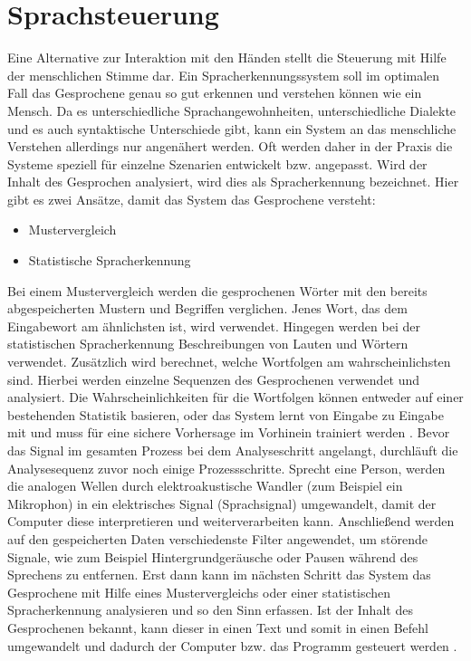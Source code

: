 \section{Sprachsteuerung}
Eine Alternative zur Interaktion mit den Händen stellt die Steuerung mit Hilfe der menschlichen Stimme dar. Ein Spracherkennungssystem soll im optimalen Fall das \mbox{Gesprochene} genau so gut erkennen und verstehen können wie ein Mensch. Da es unterschiedliche Sprachangewohnheiten, unterschiedliche Dialekte und es auch \mbox{syntaktische} Unterschiede gibt, kann ein System an das menschliche Verstehen \mbox{allerdings} nur angenähert werden. Oft werden daher in der Praxis die Systeme speziell für einzelne Szenarien entwickelt bzw. angepasst. 
\newline \newline
Wird der Inhalt des Gesprochen analysiert, wird dies als Spracherkennung bezeichnet. Hier gibt es zwei Ansätze, damit das System das Gesprochene versteht:
\begin{itemize}
      \item Mustervergleich
      \item Statistische Spracherkennung
\end{itemize}
\vspace{\baselineskip}
Bei einem Mustervergleich werden die gesprochenen Wörter mit den bereits abgespeicherten Mustern und Begriffen verglichen. Jenes Wort, das dem Eingabewort am ähnlichsten ist, wird verwendet. Hingegen werden bei der statistischen Spracherkennung Beschreibungen von Lauten und Wörtern verwendet. Zusätzlich wird berechnet, welche Wortfolgen am wahrscheinlichsten sind. Hierbei werden einzelne Sequenzen des Gesprochenen verwendet und analysiert. Die Wahrscheinlichkeiten für die Wortfolgen können entweder auf einer bestehenden Statistik basieren, oder das System lernt von Eingabe zu Eingabe mit und muss für eine sichere Vorhersage im Vorhinein trainiert werden \cite{KaufmannPfisterSprache}. 
\newline \newline
Bevor das Signal im gesamten Prozess bei dem Analyseschritt angelangt, durchläuft die Analysesequenz zuvor noch einige Prozessschritte. Sprecht eine Person, werden die analogen Wellen durch elektroakustische Wandler (zum Beispiel ein Mikrophon) in ein elektrisches Signal (Sprachsignal) umgewandelt, damit der Computer diese interpretieren und weiterverarbeiten kann. Anschließend werden auf den gespeicherten Daten verschiedenste Filter angewendet, um störende Signale, wie zum Beispiel \mbox{Hintergrundgeräusche} oder Pausen während des Sprechens zu entfernen. Erst dann kann im nächsten Schritt das System das Gesprochene mit Hilfe eines Mustervergleichs oder einer statistischen Spracherkennung analysieren und so den Sinn erfassen. Ist der Inhalt des Gesprochenen bekannt, kann dieser in einen Text und somit in einen Befehl umgewandelt und dadurch der Computer bzw. das Programm gesteuert werden \cite{KaufmannPfisterSprache}.

